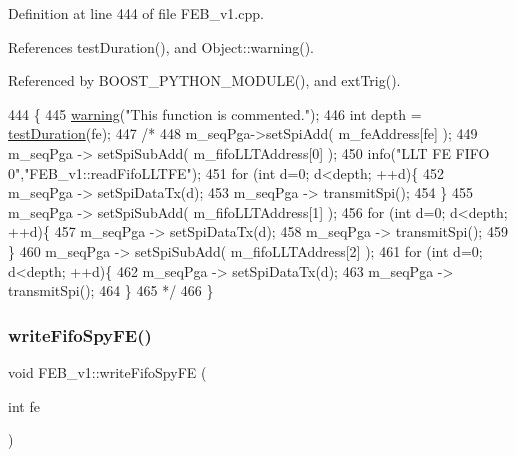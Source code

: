 Definition at line 444 of file F\+E\+B\+\_\+v1.\+cpp.



References test\+Duration(), and Object\+::warning().



Referenced by B\+O\+O\+S\+T\+\_\+\+P\+Y\+T\+H\+O\+N\+\_\+\+M\+O\+D\+U\+L\+E(), and ext\+Trig().


\begin{DoxyCode}
444                                   \{
445   \hyperlink{classObject_a65cd4fda577711660821fd2cd5a3b4c9}{warning}(\textcolor{stringliteral}{"This function is commented."});
446   \textcolor{keywordtype}{int} depth = \hyperlink{classFEB__v1_a7f1db8ca9490172fce7603da9e703dec}{testDuration}(fe);
447   \textcolor{comment}{/*}
448 \textcolor{comment}{  m\_seqPga->setSpiAdd( m\_feAddress[fe] );}
449 \textcolor{comment}{  m\_seqPga -> setSpiSubAdd( m\_fifoLLTAddress[0] );  }
450 \textcolor{comment}{  info("LLT FE FIFO 0","FEB\_v1::readFifoLLTFE");        }
451 \textcolor{comment}{  for (int d=0; d<depth; ++d)\{ }
452 \textcolor{comment}{    m\_seqPga -> setSpiDataTx(d);}
453 \textcolor{comment}{    m\_seqPga -> transmitSpi();}
454 \textcolor{comment}{  \}}
455 \textcolor{comment}{  m\_seqPga -> setSpiSubAdd( m\_fifoLLTAddress[1] );}
456 \textcolor{comment}{  for (int d=0; d<depth; ++d)\{ }
457 \textcolor{comment}{    m\_seqPga -> setSpiDataTx(d);}
458 \textcolor{comment}{    m\_seqPga -> transmitSpi();}
459 \textcolor{comment}{  \}}
460 \textcolor{comment}{  m\_seqPga -> setSpiSubAdd( m\_fifoLLTAddress[2] );}
461 \textcolor{comment}{  for (int d=0; d<depth; ++d)\{ }
462 \textcolor{comment}{    m\_seqPga -> setSpiDataTx(d);}
463 \textcolor{comment}{    m\_seqPga -> transmitSpi();}
464 \textcolor{comment}{    \}}
465 \textcolor{comment}{*/}
466 \}
\end{DoxyCode}
\mbox{\label{classFEB__v1_a0fd77cbaae9ae853e5c4dfc81b4462a5}} 
\subsubsection{\texorpdfstring{write\+Fifo\+Spy\+F\+E()}{writeFifoSpyFE()}}
{\footnotesize\ttfamily void F\+E\+B\+\_\+v1\+::write\+Fifo\+Spy\+FE (\begin{DoxyParamCaption}\item[{int}]{fe }\end{DoxyParamCaption})}




